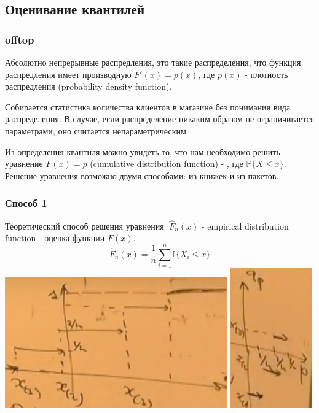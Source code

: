 \documentclass[a4 paper]{article}
\begin{document}
\subsection{Оценивание квантилей}

\subsubsection*{offtop}
Абсолютно непрерывные распредления, это такие распределения, что функция распредления имеет производную $F'(x) = p(x)$, где $p(x)$ - плотность распредления (probability density function).

Собирается статистика количества клиентов в магазине без понимания вида распределения. В случае, если распределение никаким образом не ограничивается параметрами, оно считается непараметрическим. 

Из определения квантиля можно увидеть то, что нам необходимо решить уравнение $F(x) = p$ (cumulative distribution function) - , где $\mathbb{P}\{X \leq x\}$. Решение уравнения возможно двумя способами: из книжек и из пакетов.

\subsubsection{Способ 1}
Теоретический способ решения уравнения. $\hat{F}_n (x)$ - empirical distribution function - оценка функции $F(x)$.
$$
\hat{F}_n (x) = \frac1n\sum_{i=1}^n \mathbb{I}\{X_i \leq x\}
$$
\includegraphics[scale=0.5]{F(x).png}
\includegraphics[scale=0.5]{q(p).png}
\end{document}

